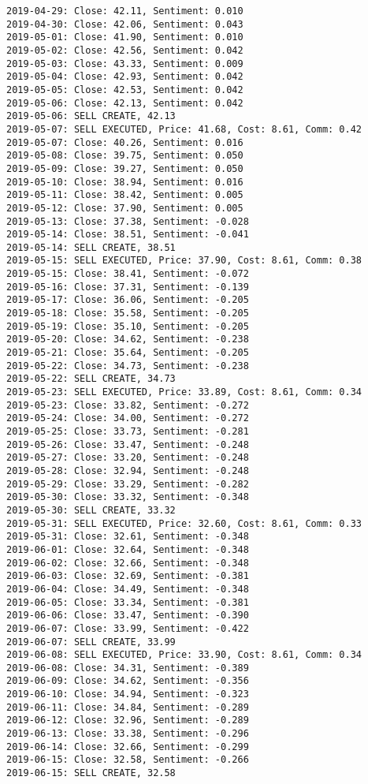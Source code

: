 \documentclass[11pt]{article}
\begin{document}
\begin{Verbatim}[commandchars=\\\{\}]
2019-04-29: Close: 42.11, Sentiment: 0.010
2019-04-30: Close: 42.06, Sentiment: 0.043
2019-05-01: Close: 41.90, Sentiment: 0.010
2019-05-02: Close: 42.56, Sentiment: 0.042
2019-05-03: Close: 43.33, Sentiment: 0.009
2019-05-04: Close: 42.93, Sentiment: 0.042
2019-05-05: Close: 42.53, Sentiment: 0.042
2019-05-06: Close: 42.13, Sentiment: 0.042
2019-05-06: SELL CREATE, 42.13
2019-05-07: SELL EXECUTED, Price: 41.68, Cost: 8.61, Comm: 0.42
2019-05-07: Close: 40.26, Sentiment: 0.016
2019-05-08: Close: 39.75, Sentiment: 0.050
2019-05-09: Close: 39.27, Sentiment: 0.050
2019-05-10: Close: 38.94, Sentiment: 0.016
2019-05-11: Close: 38.42, Sentiment: 0.005
2019-05-12: Close: 37.90, Sentiment: 0.005
2019-05-13: Close: 37.38, Sentiment: -0.028
2019-05-14: Close: 38.51, Sentiment: -0.041
2019-05-14: SELL CREATE, 38.51
2019-05-15: SELL EXECUTED, Price: 37.90, Cost: 8.61, Comm: 0.38
2019-05-15: Close: 38.41, Sentiment: -0.072
2019-05-16: Close: 37.31, Sentiment: -0.139
2019-05-17: Close: 36.06, Sentiment: -0.205
2019-05-18: Close: 35.58, Sentiment: -0.205
2019-05-19: Close: 35.10, Sentiment: -0.205
2019-05-20: Close: 34.62, Sentiment: -0.238
2019-05-21: Close: 35.64, Sentiment: -0.205
2019-05-22: Close: 34.73, Sentiment: -0.238
2019-05-22: SELL CREATE, 34.73
2019-05-23: SELL EXECUTED, Price: 33.89, Cost: 8.61, Comm: 0.34
2019-05-23: Close: 33.82, Sentiment: -0.272
2019-05-24: Close: 34.00, Sentiment: -0.272
2019-05-25: Close: 33.73, Sentiment: -0.281
2019-05-26: Close: 33.47, Sentiment: -0.248
2019-05-27: Close: 33.20, Sentiment: -0.248
2019-05-28: Close: 32.94, Sentiment: -0.248
2019-05-29: Close: 33.29, Sentiment: -0.282
2019-05-30: Close: 33.32, Sentiment: -0.348
2019-05-30: SELL CREATE, 33.32
2019-05-31: SELL EXECUTED, Price: 32.60, Cost: 8.61, Comm: 0.33
2019-05-31: Close: 32.61, Sentiment: -0.348
2019-06-01: Close: 32.64, Sentiment: -0.348
2019-06-02: Close: 32.66, Sentiment: -0.348
2019-06-03: Close: 32.69, Sentiment: -0.381
2019-06-04: Close: 34.49, Sentiment: -0.348
2019-06-05: Close: 33.34, Sentiment: -0.381
2019-06-06: Close: 33.47, Sentiment: -0.390
2019-06-07: Close: 33.99, Sentiment: -0.422
2019-06-07: SELL CREATE, 33.99
2019-06-08: SELL EXECUTED, Price: 33.90, Cost: 8.61, Comm: 0.34
2019-06-08: Close: 34.31, Sentiment: -0.389
2019-06-09: Close: 34.62, Sentiment: -0.356
2019-06-10: Close: 34.94, Sentiment: -0.323
2019-06-11: Close: 34.84, Sentiment: -0.289
2019-06-12: Close: 32.96, Sentiment: -0.289
2019-06-13: Close: 33.38, Sentiment: -0.296
2019-06-14: Close: 32.66, Sentiment: -0.299
2019-06-15: Close: 32.58, Sentiment: -0.266
2019-06-15: SELL CREATE, 32.58

\end{Verbatim}
\end{document}
